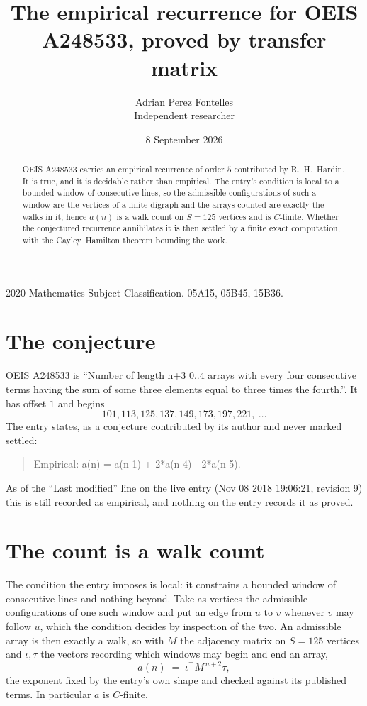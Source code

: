 \documentclass[11pt,a4paper]{article}
\title{The empirical recurrence for OEIS A248533, proved by transfer matrix}
\author{Adrian Perez Fontelles\\ \small Independent researcher}
\date{8 September 2026}
\theoremstyle{plain}
\theoremstyle{definition}
\begin{document}
\maketitle

\begin{abstract}
OEIS A248533 carries an empirical recurrence of order $5$ contributed by R.~H.~Hardin. It is
true, and it is decidable rather than empirical. The entry's condition is local to a bounded window of consecutive lines, so
the admissible configurations of such a window are the vertices of a finite digraph and the
arrays counted are exactly the walks in it; hence $a(n)$ is a walk count on $S=125$ vertices
and is $C$-finite. Whether the conjectured recurrence annihilates it is then settled by a
finite exact computation, with the Cayley--Hamilton theorem bounding the work.
\end{abstract}

\noindent\small 2020 Mathematics Subject Classification. 05A15, 05B45, 15B36.\normalsize

\section{The conjecture}

OEIS A248533 is ``Number of length n+3 0..4 arrays with every four consecutive terms having the sum of some three elements equal to three times the fourth.''. It has offset $1$ and begins
\[
101, 113, 125, 137, 149, 173, 197, 221,\ \dots
\]
The entry states, as a conjecture contributed by its author and never marked settled:
\begin{quote}
Empirical: a(n) = a(n-1) + 2*a(n-4) - 2*a(n-5).
\end{quote}
As of the ``Last modified'' line on the live entry (Nov 08 2018 19:06:21, revision 9) this is still
recorded as empirical, and nothing on the entry records it as proved.

\section{The count is a walk count}

The condition the entry imposes is local: it constrains a bounded window of consecutive lines and nothing beyond. Take as
vertices the admissible configurations of one such window and put an edge from $u$ to $v$
whenever $v$ may follow $u$, which the condition decides by inspection of the two. An
admissible array is then exactly a walk, so with $M$ the adjacency matrix on $S=125$ vertices
and $\iota,\tau$ the vectors recording which windows may begin and end an array,
\[
a(n)\;=\;\iota^{\!\top}M^{\,n+2}\tau ,
\]
the exponent fixed by the entry's own shape and checked against its published terms. In
particular $a$ is $C$-finite.
\end{document}
